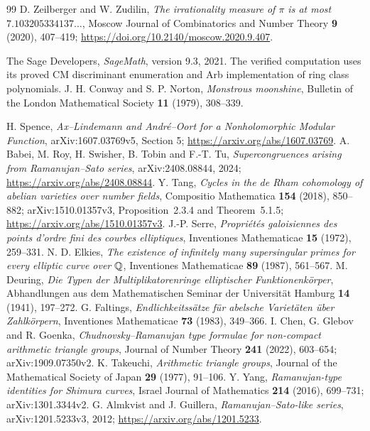 \begin{thebibliography}{99}
 D. Zeilberger and W. Zudilin,
\emph{The irrationality measure of $\pi$ is at most $7.103205334137\ldots$},
Moscow Journal of Combinatorics and Number Theory \textbf{9} (2020),
407--419; \url{https://doi.org/10.2140/moscow.2020.9.407}.


 The Sage Developers, \emph{SageMath}, version 9.3, 2021.
The verified computation uses its proved CM discriminant enumeration
and Arb implementation of ring class polynomials.
 J. H. Conway and S. P. Norton,
\emph{Monstrous moonshine}, Bulletin of the London Mathematical Society
\textbf{11} (1979), 308--339.
 \raggedright H. Spence,
\emph{Ax--Lindemann and Andr\'e--Oort for a Nonholomorphic Modular Function},
arXiv:1607.03769v5, Section 5;
\url{https://arxiv.org/abs/1607.03769}.
 A. Babei, M. Roy, H. Swisher, B. Tobin and F.-T. Tu,
\emph{Supercongruences arising from Ramanujan--Sato series},
arXiv:2408.08844, 2024;
\url{https://arxiv.org/abs/2408.08844}.
 Y. Tang,
\emph{Cycles in the de Rham cohomology of abelian varieties over number fields},
Compositio Mathematica \textbf{154} (2018), 850--882;
arXiv:1510.01357v3, Proposition~2.3.4 and Theorem~5.1.5;
\url{https://arxiv.org/abs/1510.01357v3}.
 J.-P. Serre,
\emph{Propri\'et\'es galoisiennes des points d'ordre fini des courbes
elliptiques}, Inventiones Mathematicae \textbf{15} (1972), 259--331.
 N. D. Elkies,
\emph{The existence of infinitely many supersingular primes for every
elliptic curve over $\mathbb Q$}, Inventiones Mathematicae
\textbf{89} (1987), 561--567.
 M. Deuring,
\emph{Die Typen der Multiplikatorenringe elliptischer Funktionenk\"orper},
Abhandlungen aus dem Mathematischen Seminar der Universit\"at Hamburg
\textbf{14} (1941), 197--272.
 G. Faltings,
\emph{Endlichkeitss\"atze f\"ur abelsche Variet\"aten \"uber Zahlk\"orpern},
Inventiones Mathematicae \textbf{73} (1983), 349--366.
 I. Chen, G. Glebov and R. Goenka,
\emph{Chudnovsky--Ramanujan type formulae for non-compact arithmetic
triangle groups}, Journal of Number Theory \textbf{241} (2022), 603--654;
arXiv:1909.07350v2.
 K. Takeuchi,
\emph{Arithmetic triangle groups}, Journal of the Mathematical Society
of Japan \textbf{29} (1977), 91--106.
 Y. Yang, \emph{Ramanujan-type identities for Shimura curves},
Israel Journal of Mathematics \textbf{214} (2016), 699--731;
arXiv:1301.3344v2.
 G. Almkvist and J. Guillera,
\emph{Ramanujan--Sato-like series}, arXiv:1201.5233v3, 2012;
\url{https://arxiv.org/abs/1201.5233}.


\end{thebibliography}
